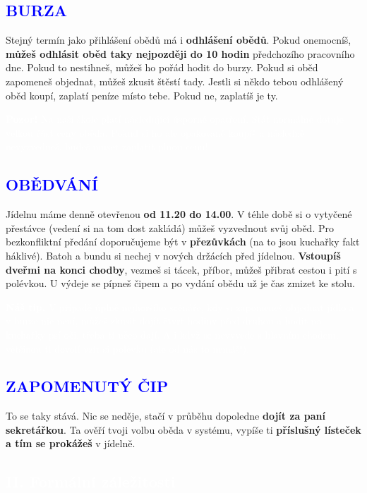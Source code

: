 \documentclass[a5paper, twoside]{article}
\newcommand{\boxik}[3]{
  \begin{tcolorbox}[
    sharp corners,
    colback = #1,
    boxrule = 0pt,
    grow to left by = 25pt,
    grow to right by = 25pt,
    right = 22pt,
    left = 22pt%
  ]
    \textcolor{#2}{#3}
  \end{tcolorbox}
}
\newcommand{\polonadpis}[4]{
  \vspace*{-50pt}
  \begin{tcolorbox}[colback = #2, boxrule = 0pt, grow to left by = #4,  grow to right by = #4, arc=8pt, height = 30pt]
    \vspace*{5pt}
    \centering \subsection*{\textcolor{#3}{#1}}
  \end{tcolorbox}
}
\newcommand{\podnadpis}[2]{
  \subsection*{\textcolor{#2}{#1}}
}
\begin{document}
\podnadpis{BURZA}{blue}
Stejný termín jako přihlášení obědů má i \textbf{odhlášení obědů}. Pokud onemocníš, \textbf{můžeš odhlásit oběd taky nejpozději do 10 hodin} předchozího pracovního dne. Pokud to nestihneš, můžeš ho pořád hodit do burzy. Pokud si oběd zapomeneš objednat, můžeš zkusit štěstí tady. Jestli si někdo tebou odhlášený oběd koupí, zaplatí peníze místo tebe. Pokud ne, zaplatíš je ty.

\boxik{blue}{white}{\textbf{Pozor!} Na naší škole platí následující úsporné opatření. Stát normálně dotuje velkou část ceny oběda. Pokud si ho ale opakovaně koupíš a následně nevyzvedneš, budeš muset zaplatit plnou cenu!}

\podnadpis{OBĚDVÁNÍ}{blue}
Jídelnu máme denně otevřenou \textbf{od 11.20 do 14.00}. V téhle době si o vytyčené přestávce (vedení si na tom dost zakládá) můžeš vyzvednout svůj oběd. Pro bezkonfliktní předání doporučujeme být v \textbf{přezůvkách} (na to jsou kuchařky fakt háklivé). Batoh a bundu si nechej v nových držácích před jídelnou. \textbf{Vstoupíš dveřmi na konci chodby}, vezmeš si tácek, příbor, můžeš přibrat cestou i pití s polévkou. U výdeje se pípneš čipem a po vydání obědu už je čas zmizet ke stolu.
\vspace{7pt}

\boxik{blue}{white}{\textbf{Náš tip.} V případě úplně nejhoršího scénáře, kdy si zapomeneš objednat jídlo a v burze nic není, můžeš zkusit dojít čtvrt hodiny před druhou a hodit na kuchařky psí oči, třeba ti něco dají. A i když se nevyvede s hlavním chodem, většinou ti dovolí vzít si polévku (ale od nás to nemáš!).}

\podnadpis{ZAPOMENUTÝ ČIP}{blue}
To se taky stává. Nic se neděje, stačí v průběhu dopoledne \textbf{dojít za paní
	sekretářkou}. Ta ověří tvoji volbu oběda v systému, vypíše ti \textbf{příslušný lísteček
	a tím se prokážeš} v jídelně.

\pagebreak

\polonadpis{II. Formální záležitosti}{blue}{white}{-3.8cm}
\end{document}
